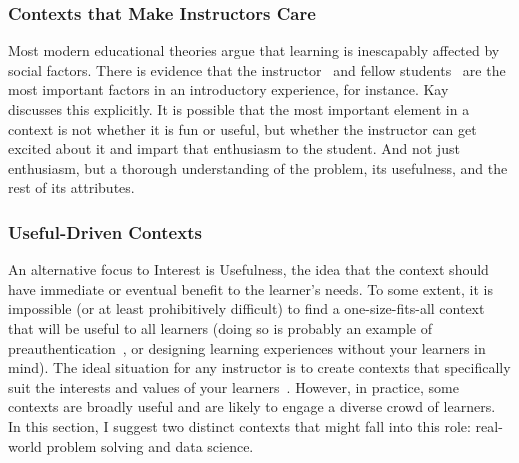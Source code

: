 \subsubsection{Contexts that Make Instructors Care}

Most modern educational theories argue that learning is inescapably affected by social factors.
There is evidence that the instructor~\cite{thompson2009engine} and fellow students~\cite{Barker:2009} are the most important factors in an introductory experience, for instance.
Kay~\cite{Kay:2011} discusses this explicitly.
It is possible that the most important element in a context is not whether it is fun or useful, but whether the instructor can get excited about it and impart that enthusiasm to the student.
And not just enthusiasm, but a thorough understanding of the problem, its usefulness, and the rest of its attributes.

\subsubsection{Useful-Driven Contexts}

An alternative focus to Interest is Usefulness, the idea that the context should have immediate or eventual benefit to the learner's needs.
To some extent, it is impossible (or at least prohibitively difficult) to find a one-size-fits-all context that will be useful to all learners (doing so is probably an example of preauthentication~\cite{preauthentication}, or designing learning experiences without your learners in mind).
The ideal situation for any instructor is to create contexts that specifically suit the interests and values of your learners~\cite{DiSalvo:2011}.
However, in practice, some contexts are broadly useful and are likely to engage a diverse crowd of learners.
In this section, I suggest two distinct contexts that might fall into this role: real-world problem solving and data science.

